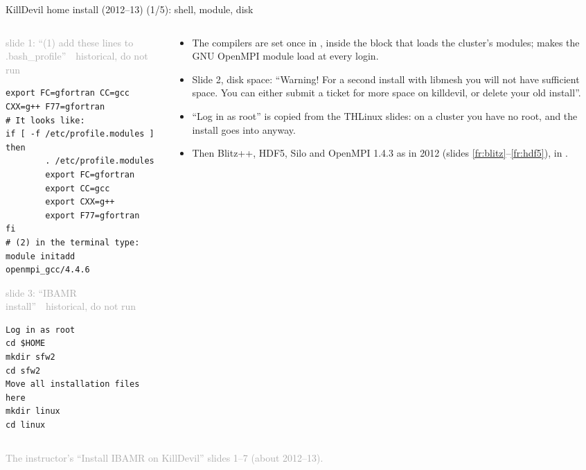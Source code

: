 \documentclass[aspectratio=169,11pt]{beamer}
\newcommand{\sourcecredit}[1]{\vfill\begin{flushright}\tiny\textcolor{DarkGray}{#1}\end{flushright}}
\newcommand{\hist}[1]{{\tiny\sffamily\textcolor{DarkGray}{#1\ \textbullet\ historical, do not run}}\par\nointerlineskip\vspace{0.3mm}}
\begin{document}
\begin{frame}[fragile]{KillDevil home install (2012--13) (1/5): shell, module, disk}
\label{fr:kd1}
\begin{columns}[T,onlytextwidth]
\begin{column}{0.5\textwidth}
\hist{slide 1: ``(1) add these lines to .bash\_profile''}
\begin{lstlisting}[style=hist]
export FC=gfortran CC=gcc CXX=g++ F77=gfortran
# It looks like:
if [ -f /etc/profile.modules ]
then
        . /etc/profile.modules
        export FC=gfortran
        export CC=gcc
        export CXX=g++
        export F77=gfortran
fi
# (2) in the terminal type:
module initadd openmpi_gcc/4.4.6
\end{lstlisting}
\hist{slide 3: ``IBAMR install''}
\begin{lstlisting}[style=hist]
Log in as root
cd $HOME
mkdir sfw2
cd sfw2
Move all installation files here
mkdir linux
cd linux
\end{lstlisting}
\end{column}
\begin{column}{0.47\textwidth}
\scriptsize
\begin{itemize}\setlength{\itemsep}{2pt}
  \item The compilers are set once in , inside the block that loads the cluster's modules;  makes the GNU OpenMPI module load at every login.
  \item Slide 2, disk space: ``Warning! For a second install with libmesh you will not have sufficient space. You can either submit a ticket for more space on killdevil, or delete your old install''.
  \item ``Log in as root'' is copied from the THLinux slides: on a cluster you have no root, and the install goes into  anyway.
  \item Then Blitz++, HDF5, Silo and OpenMPI 1.4.3 as in 2012 (slides \ref{fr:blitz}--\ref{fr:hdf5}), in .
\end{itemize}
\end{column}
\end{columns}
\sourcecredit{The instructor's ``Install IBAMR on KillDevil'' slides 1--7 (about 2012--13).}
\end{frame}
\end{document}
